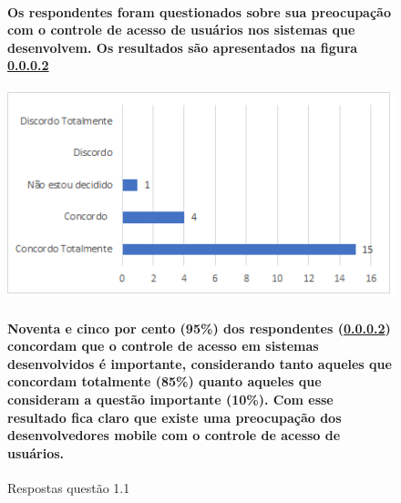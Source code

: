 \begin{figure}[t]
\centering

\paragraph{
Os respondentes foram questionados sobre sua preocupação com o controle de acesso de usuários nos sistemas que desenvolvem. Os resultados são apresentados na figura \ref{fig:1.1}
}
\includegraphics[scale=0.8]{figuras das questoes/1.1.PNG}
\caption{Respostas questão 1.1}

\paragraph{
Noventa e cinco por cento (95{\%}) dos respondentes (\ref{fig:1.1}) concordam que o controle de acesso em sistemas desenvolvidos é importante, considerando tanto aqueles que concordam totalmente (85{\%}) quanto aqueles que consideram a questão importante (10{\%}). Com esse resultado fica claro que existe uma preocupação dos desenvolvedores mobile com o controle de acesso de usuários.
}

\label{fig:1.1}
\end{figure}
